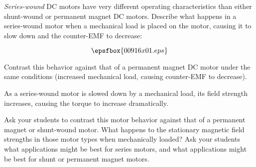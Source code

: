 

{\it Series-wound} DC motors have very different operating characteristics than either shunt-wound or permanent magnet DC motors.  Describe what happens in a series-wound motor when a mechanical load is placed on the motor, causing it to slow down and the counter-EMF to decrease:

$$\epsfbox{00916x01.eps}$$

Contrast this behavior against that of a permanent magnet DC motor under the same conditions (increased mechanical load, causing counter-EMF to decrease).







As a series-wound motor is slowed down by a mechanical load, its field strength increases, causing the torque to increase dramatically.







Ask your students to contrast this motor behavior against that of a permanent magnet or shunt-wound motor.  What happens to the stationary magnetic field strengths in those motor types when mechanically loaded?  Ask your students what applications might be best for series motors, and what applications might be best for shunt or permanent magnet motors.



